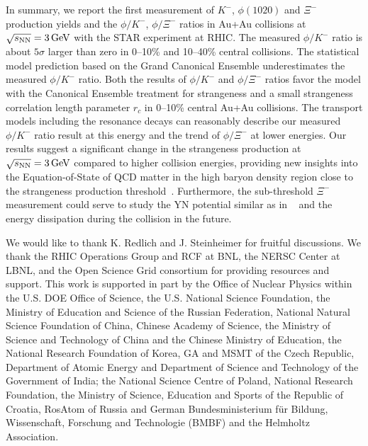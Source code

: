 \documentclass[%
 reprint,	
showpacs,
 amsmath,amssymb,
 aps,
 prc,
]{revtex4-1}
\begin{document}
In summary, we report the first measurement of $K^-$, $\phi(1020)$ and $\Xi^{-}$ production yields  and the $\phi/K^-$, $\phi/\Xi^-$ ratios in Au+Au collisions at ${\sqrt{s_{\rm NN}} = \rm{3\,GeV}}$ with the STAR experiment at RHIC. The measured $\phi/K^-$ ratio is about $5\sigma$ larger than zero in 0--10\% and 10--40\% central collisions. The statistical model prediction based on the Grand Canonical Ensemble underestimates the measured $\phi/K^-$ ratio. Both the results of $\phi/K^-$ and $\phi/\Xi^-$ ratios favor the model with the Canonical Ensemble treatment for strangeness and a small strangeness correlation length parameter $r_c$ in 0--10\% central Au+Au collisions. The transport models including the resonance decays can reasonably describe our measured $\phi/K^-$ ratio result at this energy and the trend of $\phi/\Xi^-$ at lower energies. Our results suggest a significant change in the strangeness production at ${\sqrt{s_{\rm NN}} = \rm{3\,GeV}}$ compared to higher collision energies, providing new insights into the Equation-of-State of QCD matter in the high baryon density region close to the strangeness production threshold~\cite{KO_sQM17,yong2021double}. Furthermore, the sub-threshold $\Xi^-$ measurement could serve to study the YN potential similar as in ~\cite{Ks0_Lambda_HADES} and the energy dissipation during the collision in the future. 




We would like to thank K. Redlich and J. Steinheimer for fruitful discussions.
We thank the RHIC Operations Group and RCF at BNL, the NERSC Center at LBNL, and the Open Science Grid consortium for providing resources and support. This work is supported in part by the Office of Nuclear Physics within the U.S. DOE Office of Science, the U.S. National Science Foundation, the Ministry of Education and Science of the Russian Federation, National Natural Science Foundation of China, Chinese Academy of Science, the Ministry of Science and Technology of China and the Chinese Ministry of Education, the National Research Foundation of Korea, GA and MSMT of the Czech Republic, Department of Atomic Energy and Department of Science and Technology of the Government of India; the National Science Centre of Poland, National Research Foundation, the Ministry of Science, Education and Sports of the Republic of Croatia, RosAtom of Russia and German Bundesministerium f{\"u}r Bildung, Wissenschaft, Forschung and Technologie (BMBF) and the Helmholtz Association.


\end{document}
